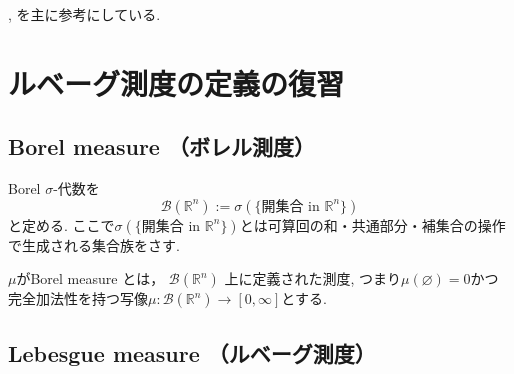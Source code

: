 \cite[Chapter 1, 3, 6]{Rud}, \cite[Chapter 3]{NO}を主に参考にしている.
 
\section*{ルベーグ測度の定義の復習}
\subsection*{ Borel measure （ボレル測度）}


\begin{tcolorbox}[mybox]
\begin{defn}
Borel \(\sigma\)-代数を
\[
\mathcal{B}(\mathbb{R}^n) := \sigma(\{\text{開集合 in } \mathbb{R}^n\})
\]
と定める. ここで$ \sigma(\{\text{開集合 in } \mathbb{R}^n\})$とは可算回の和・共通部分・補集合の操作で生成される集合族をさす.

$\mu$がBorel measure とは，   \(\mathcal{B}(\mathbb{R}^n)\) 上に定義された測度, つまり$\mu(\varnothing)=0$かつ完全加法性を持つ写像$\mu : \mathcal{B}(\mathbb{R}^n) \to [0, \infty]$とする. 
\end{defn}
\end{tcolorbox}

\subsection*{Lebesgue measure （ルベーグ測度）}

